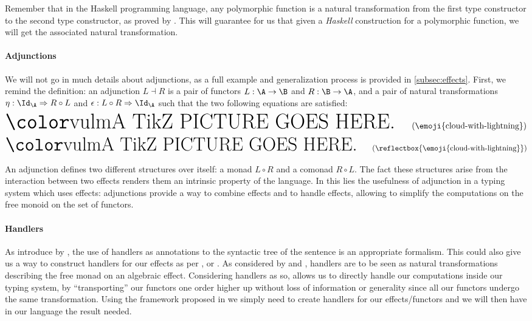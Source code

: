 \documentclass[math, english, info]{cours}
\begin{document}
Remember that in the Haskell programming language, any polymorphic function is a natural transformation from the first type constructor to the second type constructor, as proved by .
This will guarantee for us that given a \emph{Haskell} construction for a polymorphic function, we will get the associated natural transformation.

\paragraph{Adjunctions}
\label{par:adjunctions}
We will not go in much details about adjunctions, as a full example and generalization process is provided in \ref{subsec:effects}.
First, we remind the definition: an adjunction $L \dashv R$ is a pair of functors $L: \A \to \B$ and $R: \B \to \A$, and a pair of natural transformations $\eta: \Id_{\A}  \Rightarrow R \circ L$ and $\epsilon: L\circ R \Rightarrow \Id_{\A}$ such that the two following equations are satisfied:
\begin{equation}
	\inputtikz{cd-zigzag}
	\label{eq:zigzag}
	\tag{\emoji{cloud-with-lightning}}
\end{equation}
\begin{equation}
	\inputtikz{cd-zagzig}
	\label{eq:zagzig}
	\tag{\reflectbox{\emoji{cloud-with-lightning}}}
\end{equation}

An adjunction defines two different structures over itself: a monad $L \circ R$ and a comonad $R\circ L$.
The fact these structures arise from the interaction between two effects renders them an intrinsic property of the language.
In this lies the usefulness of adjunction in a typing system which uses effects: adjunctions provide a way to combine effects and to handle effects, allowing to simplify the computations on the free monoid on the set of functors.

\paragraph{Handlers}
\label{par:handlers}
As introduce by , the use of handlers as annotations to the syntactic tree of the sentence is an appropriate formalism.
This could also give us a way to construct handlers for our effects as per , or .
As considered by  and , handlers are to be seen as natural transformations describing the free monad on an algebraic effect.
Considering handlers as so, allows us to directly handle our computations inside our typing system, by ``transporting'' our functors one order higher up without loss of information or generality since all our functors undergo the same transformation.
Using the framework proposed in \cite{vandenbergFrameworkHigherorderEffects2024} we simply need to create handlers for our effects/functors and we will then have in our language the result needed.
\end{document}
